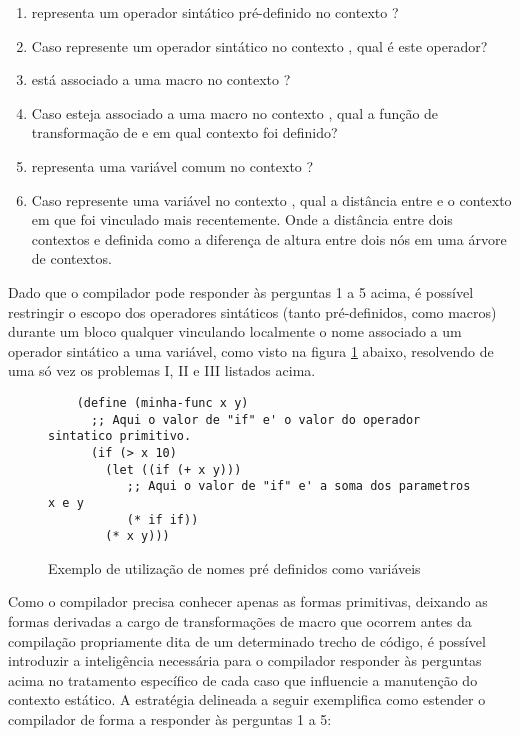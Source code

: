 \begin{enumerate}
 \item {} representa um operador sintático pré-definido no contexto ? 

 \item Caso  represente um operador sintático no contexto ,
qual é este operador?

 \item {} está associado a uma macro no contexto ? 
 
 \item Caso  esteja associado a uma macro no contexto , qual a
função de transformação de  e em qual contexto  foi definido?

 \item {} representa uma variável comum no contexto ? 

 \item Caso  represente uma variável no contexto , qual a
distância entre  e o contexto em que  foi vinculado mais
recentemente. Onde a distância entre dois contextos  e 
definida como a diferença de altura entre dois nós em uma árvore de contextos.

\end{enumerate}

Dado que o compilador pode responder às perguntas 1 a 5 acima, é possível
restringir o escopo dos operadores sintáticos (tanto pré-definidos, como
macros) durante um bloco qualquer vinculando localmente o nome associado a um
operador sintático a uma variável, como visto na figura \ref{lst:compiler-scope}
abaixo, resolvendo de uma só vez os problemas I, II e III listados acima.

\begin{figure}[h!]
\begin{lstlisting}
    (define (minha-func x y)
      ;; Aqui o valor de "if" e' o valor do operador sintatico primitivo.
      (if (> x 10)
        (let ((if (+ x y)))
           ;; Aqui o valor de "if" e' a soma dos parametros x e y
           (* if if))
        (* x y)))
\end{lstlisting}
\caption{Exemplo de utilização de nomes pré definidos como variáveis}
\label{lst:compiler-scope}
\end{figure}


Como o compilador precisa conhecer apenas as formas primitivas, deixando as
formas derivadas a cargo de transformações de macro que ocorrem antes da
compilação propriamente dita de um determinado trecho de código, é possível
introduzir a inteligência necessária para o compilador responder às perguntas
acima no tratamento específico de cada caso que influencie a manutenção do
contexto estático. A estratégia delineada a seguir exemplifica como estender o
compilador de forma a responder às perguntas 1 a 5:



